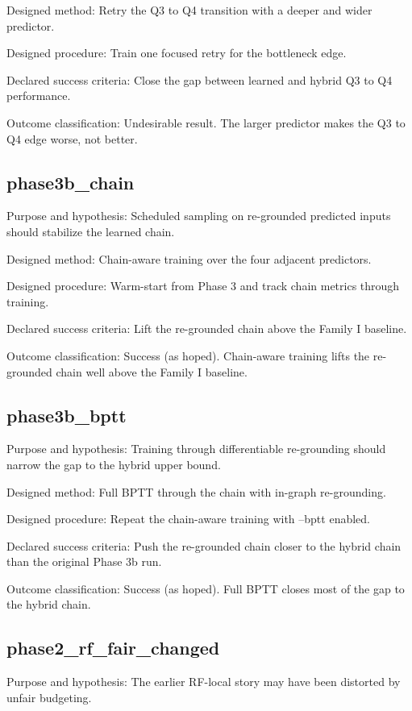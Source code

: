 \documentclass[11pt]{article}
\begin{document}
Designed method: Retry the Q3 to Q4 transition with a deeper and wider predictor.


Designed procedure: Train one focused retry for the bottleneck edge.


Declared success criteria: Close the gap between learned and hybrid Q3 to Q4 performance.


Outcome classification: Undesirable result. The larger predictor makes the Q3 to Q4 edge worse, not better.


\subsection{phase3b\_chain}
Purpose and hypothesis: Scheduled sampling on re-grounded predicted inputs should stabilize the learned chain.


Designed method: Chain-aware training over the four adjacent predictors.


Designed procedure: Warm-start from Phase 3 and track chain metrics through training.


Declared success criteria: Lift the re-grounded chain above the Family I baseline.


Outcome classification: Success (as hoped). Chain-aware training lifts the re-grounded chain well above the Family I baseline.


\subsection{phase3b\_bptt}
Purpose and hypothesis: Training through differentiable re-grounding should narrow the gap to the hybrid upper bound.


Designed method: Full BPTT through the chain with in-graph re-grounding.


Designed procedure: Repeat the chain-aware training with --bptt enabled.


Declared success criteria: Push the re-grounded chain closer to the hybrid chain than the original Phase 3b run.


Outcome classification: Success (as hoped). Full BPTT closes most of the gap to the hybrid chain.


\subsection{phase2\_rf\_fair\_changed}
Purpose and hypothesis: The earlier RF-local story may have been distorted by unfair budgeting.
\end{document}
